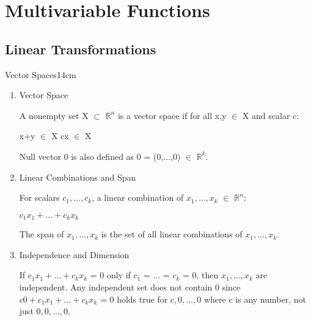 \newpage

\section[Day 16: Multivariable Functions]{ Multivariable Functions }

\subsection{ Linear Transformations }

    \begin{definition}{Vector Spaces}{14cm}
        \begin{enumerate}[label=(\alph*), leftmargin=0.5cm, itemsep=0.1cm]
            \item {\color{lblue} Vector Space}
            
                A nonempty set X $\subset$ $\mathbb{R}^n$ is a vector space if
                for all x,y $\in$ X and scalar c:
        
                \hspace{0.5cm}
                x+y $\in$ X
                \hspace{1cm}
                cx $\in$ X

                Null vector 0 is also defined as 0 = (0,...,0) $\in$ $\mathbb{R}^k$.
            
            \item {\color{lblue} Linear Combinations and Span}
            
                For scalars $c_1,...,c_k$, a linear combination of
                $x_1,...,x_k$ $\in$ $\mathbb{R}^n$:
        
                \hspace{0.5cm}
                $c_1x_1 + ... + c_kx_k$
        
                The span of $x_1,...,x_k$ is the set of all linear combinations
                of $x_1,...,x_k$.

            \item {\color{lblue} Independence and Dimension}
                
                If $c_1x_1 + ... + c_kx_k$ = 0 only if $c_1$ = ... = $c_k$ = 0,
                then $x_1,...,x_k$ are independent.
                Any independent set does not contain 0 since
                $c0 + c_1x_1 + ... + c_kx_k$ = 0 holds true for
                $c,0,...,0$ where c is any number, not just $0,0,...,0$.


\end{enumerate}
\end{definition}
